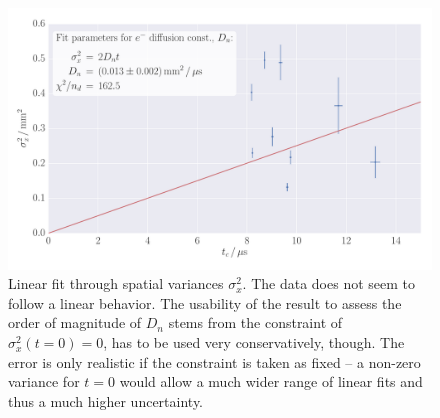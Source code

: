 \begin{figure}
    \includegraphics[width=1.0\textwidth]{figures/haynes_shockley_D_U}
    \caption{
        Linear fit through spatial variances $\sigma_x^2$. 
        The data does not seem to follow a linear behavior. 
        The usability of the result to assess the order of magnitude 
        of $D_n$ stems from the constraint of $\sigma_x^2(t = 0) = 0$, 
        has to be used very conservatively, though. The error 
        is only realistic if the constraint is taken as fixed -- 
        a non-zero variance for $t = 0$ would allow a much wider range of
        linear fits and thus a much higher uncertainty. 
        }
    \label{fig:h_s_D_U}
\end{figure}

\FloatBarrier
